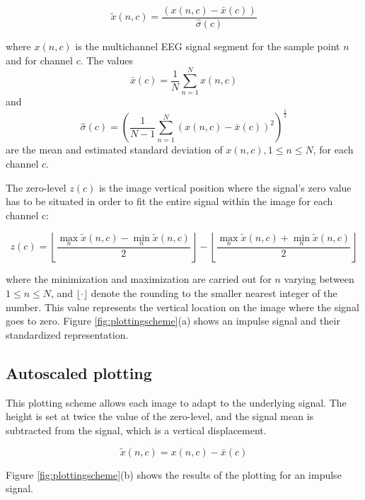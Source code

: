\begin{equation}
\tilde{x}(n,c) =  \frac{( x(n,c) - \bar{x}(c)  )}{ \hat{\sigma}(c) } 
\label{eq:standarizedaverages}
\end{equation}

\noindent  where $ x(n,c) $ is the multichannel EEG signal segment for the sample point $n$ and for channel $c$. The values $$\bar{x}(c) =\frac{1}{N}\sum_{n=1}^{N}x(n,c)$$ and $$ \hat{\sigma}(c) = (\frac{1}{N-1}\sum_{n=1}^{N}(x(n,c)-\bar{x}(c))^2 )^{\frac{1}{2}}$$ are the mean and estimated standard deviation of $x(n,c), 1 \leq n \leq N$, for each channel $c$.

The zero-level $z(c)$ is the image vertical position where the signal's zero value has to be situated in order to fit the entire signal within the image for each channel c:

\begin{equation}
z(c) = \left \lfloor{ \frac{\max_{n} \tilde{x}(n,c)  - \min_{n} \tilde{x}(n,c) }{2} }\right \rfloor -   \left \lfloor{ \frac{\max_{n} \tilde{x}(n,c)  + \min_{n} \tilde{x}(n,c)}{ 2} }\right \rfloor
\label{eq:zerolevel}
\end{equation}

\noindent where the minimization and maximization are carried out for $n$ varying between ${1 \leq n\leq N}$, and $ \lfloor \cdot  \rfloor $ denote the rounding to the smaller nearest integer of the number.  This value represents the vertical location on the image where the signal goes to zero.  Figure \ref{fig:plottingscheme}(a) shows an impulse signal and their standardized representation.


\subsection{Autoscaled plotting}

This plotting scheme allows each image to adapt to the underlying signal.  The height is set at twice the value of the zero-level, and the signal mean is subtracted from the signal, which is a vertical displacement.

\begin{equation}
\tilde{x}(n,c) =  x(n,c) - \bar{x}(c) 
\label{eq:autoscaled}
\end{equation}

Figure \ref{fig:plottingscheme}(b) shows the results of the plotting for an impulse signal.

